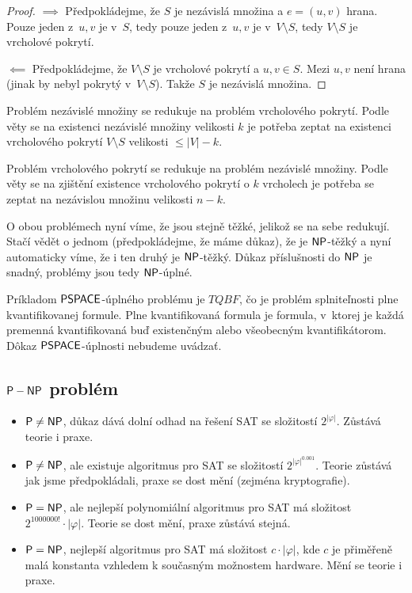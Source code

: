 \begin{proof}
$\implies$ Předpokládejme, že $S$ je nezávislá množina
a $e = (u,v)$ hrana. Pouze jeden z~$u,v$ je v~$S$,
tedy pouze jeden z~$u,v$ je v~$V \setminus S$, tedy $V \setminus S$ je
vrcholové pokrytí.

$\impliedby$ Předpokládejme, že $V \setminus S$ je vrcholové pokrytí
a $u, v \in S$. Mezi $u,v$ není hrana (jinak by nebyl pokrytý
v~$V \setminus S$). Takže $S$ je nezávislá množina.
\end{proof}

Problém nezávislé množiny se redukuje na problém vrcholového pokrytí.
Podle věty se na existenci nezávislé množiny velikosti $k$
je potřeba zeptat na existenci vrcholového pokrytí
$V \setminus S$ velikosti $ \leq \lvert V \rvert - k$.

Problém vrcholového pokrytí se redukuje na problém nezávislé množiny.
Podle věty se na zjištění existence vrcholového pokrytí o $k$ vrcholech
je potřeba se zeptat na nezávislou množinu velikosti $n-k$.

O obou problémech nyní víme, že jsou stejně těžké, jelikož se na sebe
redukují. Stačí vědět o jednom (předpokládejme, že máme důkaz), že je
${\mathsf{NP}}$-těžký a nyní automaticky víme, že i ten druhý je ${\mathsf{NP}}$-těžký.
Důkaz příslušnosti do ${\mathsf{NP}}$ je snadný, problémy jsou tedy ${\mathsf{NP}}$-úplné.

Príkladom ${\mathsf{PSPACE}}$-úplného problému je $TQBF$, čo je problém splniteľnosti
plne kvantifikovanej formule. Plne kvantifikovaná formula je formula,
v~ktorej je každá premenná kvantifikovaná buď existenčným alebo všeobecným
kvantifikátorom. Dôkaz ${\mathsf{PSPACE}}$-úplnosti nebudeme uvádzať.

\subsection{${\mathsf{P}}-{\mathsf{NP}}$ problém}

\begin{itemize}
\item ${\mathsf{P}} \neq {\ensuremath{\mathsf{NP}}}$, důkaz dává dolní odhad na řešení SAT se složitostí
    $2^{\lvert\varphi\rvert}$.
    Zůstává teorie i praxe.

\item ${\mathsf{P}} \neq {\ensuremath{\mathsf{NP}}}$, ale existuje algoritmus pro SAT se složitostí
    $2^{\lvert\varphi\rvert^{0.001}}$.
    Teorie zůstává jak jsme předpokládali, praxe se
    dost mění (zejména kryptografie).

\item ${\mathsf{P}} = {\mathsf{NP}}$, ale nejlepší polynomiální algoritmus pro SAT má
    složitost $2^{1000000!} \cdot \lvert \varphi \rvert$.  Teorie se
    dost mění, praxe zůstává stejná.

\item ${\mathsf{P}} = {\mathsf{NP}}$, nejlepší algoritmus pro SAT má složitost
    $c \cdot \lvert \varphi \rvert$, kde $c$ je přiměřeně malá konstanta
    vzhledem k současným možnostem hardware.
    Mění se teorie i praxe.
\end{itemize}

